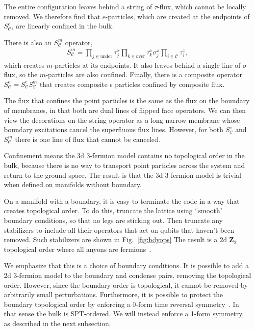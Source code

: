 \documentclass[twocolumn, longbibliography]{revtex4-2}
\newcommand{\C}{\mathcal{C}}
\begin{document}
The entire configuration leaves behind a string of $\tau$-flux, which cannot be locally removed. We therefore find that $e$-particles, which are created at the endpoints of $S^e_\C$, are linearly confined in the bulk.

There is also an $S^m_\mathcal{C}$ operator,
\begin{align}
S^m_\mathcal{C} = \prod_{j\in\text{under}} \tau^x_j  \prod_{k\in\text{over}} \tau^x_k \sigma^x_j \prod_{i\in\mathcal{C}}\tau^z_i,
\end{align}
which creates $m$-particles at its endpoints. It also leaves behind a single line of $\sigma$-flux, so the $m$-particles are also confined. Finally, there is a composite operator $S^\epsilon_\C=S^e_\C S^m_\C$ that creates composite $\epsilon$ particles confined by composite flux.
	
The flux that confines the point particles is the same as the flux on the boundary of membranes, in that both are dual lines of flipped face operators. We can then view the decorations on the string operator as a long narrow membrane whose boundary excitations cancel the superfluous flux lines. However, for both $S^e_\mathcal{C}$ and $S^m_\C$ there is one line of flux that cannot be canceled.

Confinement means the 3d 3-fermion model contains no topological order in the bulk, because there is no way to transport point particles across the system and return to the ground space. The result is that the 3d 3-fermion model is trivial when defined on manifolds without boundary.
	
On a manifold with a boundary, it is easy to terminate the code in a way that creates topological order. To do this, truncate the lattice using ``smooth" boundary conditions, so that no legs are sticking out. Then truncate any stabilizers to include all their operators that act on qubits that haven't been removed. Such stabilizers are shown in Fig.~\ref{fig:bdyops} The result is a 2d $\mathbf{Z}_2$ topological order where all anyons are fermions~\cite{BurnellSoluble}.

We emphasize that this is a choice of boundary conditions. It is possible to add a 2d 3-fermion model to the boundary and condense pairs, removing the topological order. However, since the boundary order is topological, it cannot be removed by arbitrarily small perturbations. Furthermore, it is possible to protect the boundary topological order by enforcing a 0-form time reversal symmetry~\cite{BurnellSoluble}. In that sense the bulk is SPT-ordered. We will instead enforce a 1-form symmetry, as described in the next subsection.
	
\end{document}
